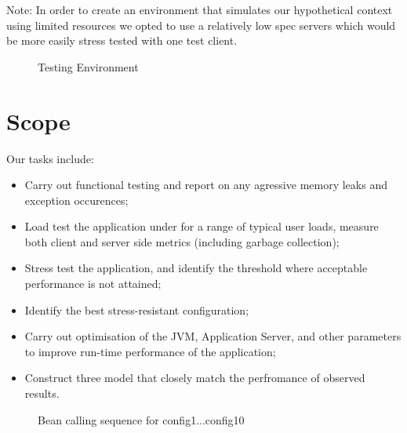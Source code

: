 Note: In order to create an environment that simulates our hypothetical context using limited resources we opted to use a relatively low spec servers which would be more easily stress tested with one test client.

\begin{figure}[h]
\centering
{}
\caption{Testing Environment}
\label{fig:4.1}
\end{figure}


\section{Scope}

Our tasks include:
\begin{itemize}
 \item Carry out functional testing and report on any agressive memory leaks and exception occurences;
  \item Load test the application under for a range of typical user loads, measure both client and server side metrics (including garbage collection);
 \item Stress test the application, and identify the threshold where acceptable performance is not attained;
 \item Identify the best stress-resistant configuration;
 \item Carry out optimisation of the JVM, Application Server, and other parameters to improve run-time performance of the application;
 \item Construct three model that closely match the perfromance of observed results.
\end{itemize}

\begin{figure}[h]
 \caption{Bean calling sequence for config1...config10}
 \label{fig_bean_calling}
\end{figure}


